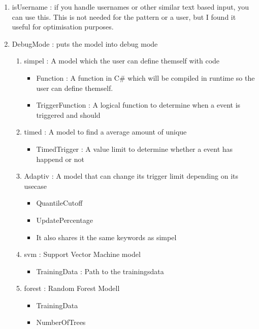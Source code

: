 \documentclass[a4paper,8pt]{article}
\begin{document}
\begin{enumerate}
\begin{enumerate}
\begin{enumerate}
				\item isUsername : if you handle usernames or other similar text based input, you can use this. This is not needed for the pattern or a user, but I found it useful for optimisation purposes.
				\item DebugMode : puts the model into debug mode
				\begin{enumerate}
					\item simpel : A model which the user can define themself with code
					\begin{itemize}
						\item Function : A function in C\# which will be compiled in runtime so the user can define themself.
						\item TriggerFunction : A logical function to determine when a event is triggered and should
					\end{itemize}
					\item timed : A model to find a average amount of unique
					\begin{itemize}
						\item TimedTrigger : A value limit to determine whether a event has happend or not
					\end{itemize}
					\item Adaptiv : A model that can change its trigger limit depending on its usecase
					\begin{itemize}
						\item QuantileCutoff
						\item UpdatePercentage
						\item It also shares it the same keywords as simpel
					\end{itemize}
					\item svm : Support Vector Machine model
					\begin{itemize}
						\item TrainingData : Path to the trainingsdata
					\end{itemize}
					\item forest : Random Forest Modell
					\begin{itemize}
						\item TrainingData
						\item NumberOfTrees
					\end{itemize}
				\end{enumerate}
			\end{enumerate}
		\end{enumerate}
	\end{enumerate}
	\newpage
	\printbibliography
\end{document}
